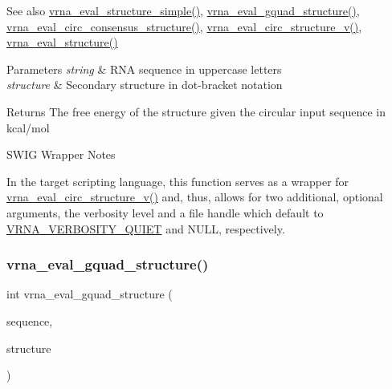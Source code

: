 \begin{DoxySeeAlso}{See also}
\mbox{\hyperlink{group__eval_ga7e5273464b775d4130245681312c1369}{vrna\+\_\+eval\+\_\+structure\+\_\+simple()}}, \mbox{\hyperlink{group__eval_ga3263504825ef4b523eba797c99921df4}{vrna\+\_\+eval\+\_\+gquad\+\_\+structure()}}, \mbox{\hyperlink{group__eval_gac96577cf232c71160f762737a994b7c6}{vrna\+\_\+eval\+\_\+circ\+\_\+consensus\+\_\+structure()}}, \mbox{\hyperlink{group__eval_gac3fb44e0773a51be8efc5f4f595a94a7}{vrna\+\_\+eval\+\_\+circ\+\_\+structure\+\_\+v()}}, \mbox{\hyperlink{group__eval_ga58f199f1438d794a265f3b27fc8ea631}{vrna\+\_\+eval\+\_\+structure()}}
\end{DoxySeeAlso}

\begin{DoxyParams}{Parameters}
{\em string} & R\+NA sequence in uppercase letters \\
\hline
{\em structure} & Secondary structure in dot-\/bracket notation \\
\hline
\end{DoxyParams}
\begin{DoxyReturn}{Returns}
The free energy of the structure given the circular input sequence in kcal/mol
\end{DoxyReturn}
\begin{DoxyRefDesc}{S\+W\+I\+G Wrapper Notes}
\item[\mbox{\hyperlink{wrappers__wrappers000036}{S\+W\+I\+G Wrapper Notes}}]In the target scripting language, this function serves as a wrapper for \mbox{\hyperlink{group__eval_gac3fb44e0773a51be8efc5f4f595a94a7}{vrna\+\_\+eval\+\_\+circ\+\_\+structure\+\_\+v()}} and, thus, allows for two additional, optional arguments, the verbosity level and a file handle which default to \mbox{\hyperlink{eval_8h_af4afe19780b61b4962c613bde324128b}{V\+R\+N\+A\+\_\+\+V\+E\+R\+B\+O\+S\+I\+T\+Y\+\_\+\+Q\+U\+I\+ET}} and N\+U\+LL, respectively. \end{DoxyRefDesc}
\mbox{\label{group__eval_ga3263504825ef4b523eba797c99921df4}} 
\subsubsection{\texorpdfstring{vrna\+\_\+eval\+\_\+gquad\+\_\+structure()}{vrna\_eval\_gquad\_structure()}}
{\footnotesize\ttfamily int vrna\+\_\+eval\+\_\+gquad\+\_\+structure (\begin{DoxyParamCaption}\item[{const char $\ast$}]{sequence,  }\item[{const char $\ast$}]{structure }\end{DoxyParamCaption})}



